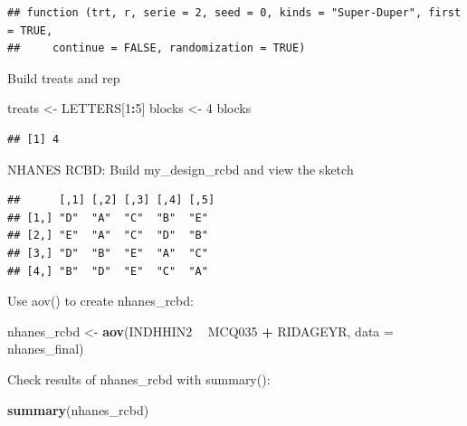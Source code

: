 \documentclass[]{book}
\newenvironment{Shaded}{\begin{snugshade}}{\end{snugshade}}
\newcommand{\DataTypeTok}[1]{\textcolor[rgb]{0.13,0.29,0.53}{#1}}
\newcommand{\DecValTok}[1]{\textcolor[rgb]{0.00,0.00,0.81}{#1}}
\newcommand{\KeywordTok}[1]{\textcolor[rgb]{0.13,0.29,0.53}{\textbf{#1}}}
\newcommand{\NormalTok}[1]{#1}
\newcommand{\OperatorTok}[1]{\textcolor[rgb]{0.81,0.36,0.00}{\textbf{#1}}}
\newcommand{\StringTok}[1]{\textcolor[rgb]{0.31,0.60,0.02}{#1}}
\begin{document}
\begin{verbatim}
## function (trt, r, serie = 2, seed = 0, kinds = "Super-Duper", first = TRUE, 
##     continue = FALSE, randomization = TRUE)
\end{verbatim}

Build treats and rep

\begin{Shaded}
\begin{Highlighting}[]
\NormalTok{treats <-}\StringTok{ }\NormalTok{LETTERS[}\DecValTok{1}\OperatorTok{:}\DecValTok{5}\NormalTok{]}
\NormalTok{blocks <-}\StringTok{ }\DecValTok{4}
\NormalTok{blocks}
\end{Highlighting}
\end{Shaded}

\begin{verbatim}
## [1] 4
\end{verbatim}

NHANES RCBD:
Build my\_design\_rcbd and view the sketch

\begin{Shaded}
\end{Shaded}

\begin{verbatim}
##      [,1] [,2] [,3] [,4] [,5]
## [1,] "D"  "A"  "C"  "B"  "E" 
## [2,] "E"  "A"  "C"  "D"  "B" 
## [3,] "D"  "B"  "E"  "A"  "C" 
## [4,] "B"  "D"  "E"  "C"  "A"
\end{verbatim}

Use aov() to create nhanes\_rcbd:

\begin{Shaded}
\begin{Highlighting}[]
\NormalTok{nhanes_rcbd <-}\StringTok{ }\KeywordTok{aov}\NormalTok{(INDHHIN2 }\OperatorTok{~}\StringTok{ }\NormalTok{MCQ035 }\OperatorTok{+}\StringTok{ }\NormalTok{RIDAGEYR, }\DataTypeTok{data =}\NormalTok{ nhanes_final)}
\end{Highlighting}
\end{Shaded}

Check results of nhanes\_rcbd with summary():

\begin{Shaded}
\begin{Highlighting}[]
\KeywordTok{summary}\NormalTok{(nhanes_rcbd)}
\end{Highlighting}
\end{Shaded}
\end{document}
